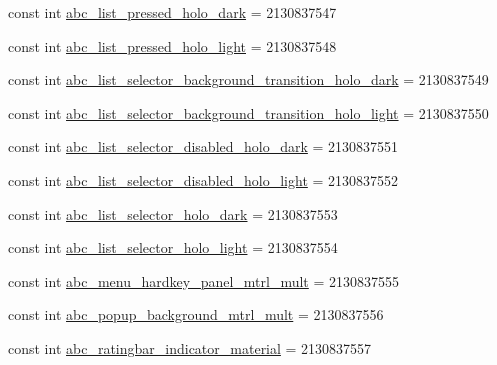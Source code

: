 \begin{DoxyCompactItemize}
\item 
const int \mbox{\hyperlink{class_f_w_p_s___app_1_1_droid_1_1_resource_1_1_drawable_aca4bd0acd0aa56539f4510fbb769adf0}{abc\+\_\+list\+\_\+pressed\+\_\+holo\+\_\+dark}} = 2130837547
\item 
const int \mbox{\hyperlink{class_f_w_p_s___app_1_1_droid_1_1_resource_1_1_drawable_a622860c41ab42d35b570908a91340b7d}{abc\+\_\+list\+\_\+pressed\+\_\+holo\+\_\+light}} = 2130837548
\item 
const int \mbox{\hyperlink{class_f_w_p_s___app_1_1_droid_1_1_resource_1_1_drawable_af95853b7d7de2be1102cb7ae7003000f}{abc\+\_\+list\+\_\+selector\+\_\+background\+\_\+transition\+\_\+holo\+\_\+dark}} = 2130837549
\item 
const int \mbox{\hyperlink{class_f_w_p_s___app_1_1_droid_1_1_resource_1_1_drawable_a0a352d8ce92772c9e319018611448639}{abc\+\_\+list\+\_\+selector\+\_\+background\+\_\+transition\+\_\+holo\+\_\+light}} = 2130837550
\item 
const int \mbox{\hyperlink{class_f_w_p_s___app_1_1_droid_1_1_resource_1_1_drawable_ab9ad84486dfeb78e9207af413a6ee1d2}{abc\+\_\+list\+\_\+selector\+\_\+disabled\+\_\+holo\+\_\+dark}} = 2130837551
\item 
const int \mbox{\hyperlink{class_f_w_p_s___app_1_1_droid_1_1_resource_1_1_drawable_a5986ccd0b172360ced21f98531a61638}{abc\+\_\+list\+\_\+selector\+\_\+disabled\+\_\+holo\+\_\+light}} = 2130837552
\item 
const int \mbox{\hyperlink{class_f_w_p_s___app_1_1_droid_1_1_resource_1_1_drawable_a5af9cbf96f47ad9909052ec303829521}{abc\+\_\+list\+\_\+selector\+\_\+holo\+\_\+dark}} = 2130837553
\item 
const int \mbox{\hyperlink{class_f_w_p_s___app_1_1_droid_1_1_resource_1_1_drawable_a2633ec2536e2653600e59b6e51b032ac}{abc\+\_\+list\+\_\+selector\+\_\+holo\+\_\+light}} = 2130837554
\item 
const int \mbox{\hyperlink{class_f_w_p_s___app_1_1_droid_1_1_resource_1_1_drawable_a437608701689794d34c0151e3455a45e}{abc\+\_\+menu\+\_\+hardkey\+\_\+panel\+\_\+mtrl\+\_\+mult}} = 2130837555
\item 
const int \mbox{\hyperlink{class_f_w_p_s___app_1_1_droid_1_1_resource_1_1_drawable_adbb9bac2bbf234d6e285844bf751be12}{abc\+\_\+popup\+\_\+background\+\_\+mtrl\+\_\+mult}} = 2130837556
\item 
const int \mbox{\hyperlink{class_f_w_p_s___app_1_1_droid_1_1_resource_1_1_drawable_a37062f5d070f4a7d5f81655c4a181fa4}{abc\+\_\+ratingbar\+\_\+indicator\+\_\+material}} = 2130837557

\end{DoxyCompactItemize}
